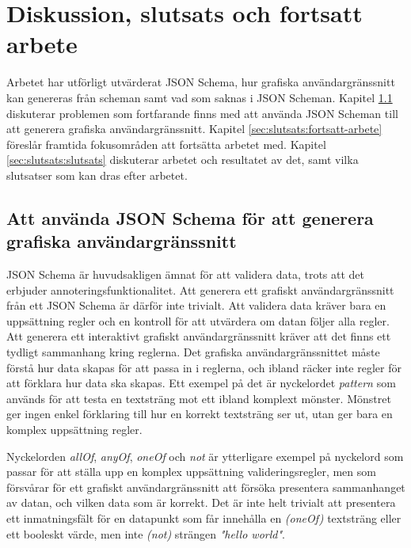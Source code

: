 \chapter{Diskussion, slutsats och fortsatt arbete}
\label{sec:slutsats}

Arbetet har utförligt utvärderat JSON Schema, hur grafiska användargränssnitt kan genereras från scheman samt vad som saknas i JSON Scheman. Kapitel \ref{sec:slutsats:json-schema} diskuterar problemen som fortfarande finns med att använda JSON Scheman till att generera grafiska användargränssnitt. Kapitel \ref{sec:slutsats:fortsatt-arbete} föreslår framtida fokusområden att fortsätta arbetet med. Kapitel \ref{sec:slutsats:slutsats} diskuterar arbetet och resultatet av det, samt vilka slutsatser som kan dras efter arbetet.


\section{Att använda JSON Schema för att generera grafiska användargränssnitt}
\label{sec:slutsats:json-schema}
JSON Schema är huvudsakligen ämnat för att validera data, trots att det erbjuder annoteringsfunktionalitet. Att generera ett grafiskt användargränssnitt från ett JSON Schema är därför inte trivialt. Att validera data kräver bara en uppsättning regler och en kontroll för att utvärdera om datan följer alla regler. Att generera ett interaktivt grafiskt användargränssnitt kräver att det finns ett tydligt sammanhang kring reglerna. Det grafiska användargränssnittet måste förstå hur data skapas för att passa in i reglerna, och ibland räcker inte regler för att förklara hur data ska skapas. Ett exempel på det är nyckelordet \textit{pattern} som används för att testa en textsträng mot ett ibland komplext mönster. Mönstret ger ingen enkel förklaring till hur en korrekt textsträng ser ut, utan ger bara en komplex uppsättning regler.

Nyckelorden \textit{allOf}, \textit{anyOf}, \textit{oneOf} och \textit{not} är ytterligare exempel på nyckelord som passar för att ställa upp en komplex uppsättning valideringsregler, men som försvårar för ett grafiskt användargränssnitt att försöka presentera sammanhanget av datan, och vilken data som är korrekt. Det är inte helt trivialt att presentera ett inmatningsfält för en datapunkt som får innehålla en \textit{(oneOf)} textsträng eller ett booleskt värde, men inte \textit{(not)} strängen \textit{"hello world"}.

